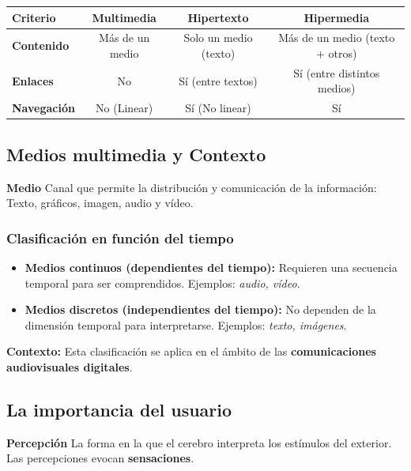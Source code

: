\documentclass[11pt,a4paper]{article}
\begin{document}
	\begin{center}
		\renewcommand{\arraystretch}{1.4} %
		\begin{tabular}{|l|c|c|c|}
			\hline
			\textbf{Criterio} & \textbf{Multimedia} & \textbf{Hipertexto} & \textbf{Hipermedia} \\
			\hline
			\textbf{Contenido}
			& Más de un medio
			& Solo un medio (texto)
			& Más de un medio (texto + otros) \\
			\hline
			\textbf{Enlaces}
			& No
			& Sí (entre textos)
			& Sí (entre distintos medios) \\
			\hline
			\textbf{Navegación}
			& No (Linear)
			& Sí (No linear)
			& Sí \\
			\hline
		\end{tabular}
	\end{center}

	\subsection{Medios multimedia y Contexto}
	\begin{DefBox}
		\textbf{Medio} Canal que permite la distribución y comunicación de la información: Texto, gráficos, imagen, audio y vídeo.
	\end{DefBox}

	\subsubsection{Clasificación en función del tiempo}

	\begin{itemize}[leftmargin=1.5em]
		\item \textbf{Medios continuos (dependientes del tiempo):}
		Requieren una secuencia temporal para ser comprendidos.
		Ejemplos: \textit{audio, vídeo}.

		\item \textbf{Medios discretos (independientes del tiempo):}
		No dependen de la dimensión temporal para interpretarse.
		Ejemplos: \textit{texto, imágenes}.
	\end{itemize}

	\begin{NotaBox}
		\textbf{Contexto:} Esta clasificación se aplica en el ámbito de las \textbf{comunicaciones audiovisuales digitales}.
	\end{NotaBox}

	\subsection*{La importancia del usuario}
	\begin{DefBox}
		\textbf{Percepción} La forma en la que el cerebro interpreta los estímulos del exterior. Las percepciones evocan \textbf{sensaciones}.
	\end{DefBox}
\end{document}
